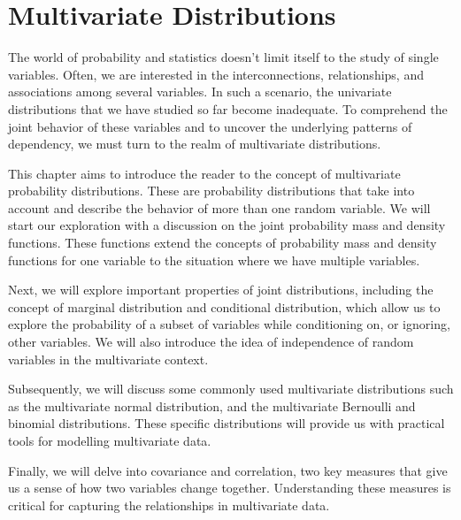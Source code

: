\chapter{Multivariate Distributions}

The world of probability and statistics doesn't limit itself to the
study of single variables. Often, we are interested in the
interconnections, relationships, and associations among several
variables. In such a scenario, the univariate distributions that we
have studied so far become inadequate. To comprehend the joint
behavior of these variables and to uncover the underlying patterns of
dependency, we must turn to the realm of multivariate distributions.

This chapter aims to introduce the reader to the concept of
multivariate probability distributions. These are probability
distributions that take into account and describe the behavior of more
than one random variable. We will start our exploration with a
discussion on the joint probability mass and density functions. These
functions extend the concepts of probability mass and density
functions for one variable to the situation where we have multiple
variables.

Next, we will explore important properties of joint distributions,
including the concept of marginal distribution and conditional
distribution, which allow us to explore the probability of a subset of
variables while conditioning on, or ignoring, other variables. We will
also introduce the idea of independence of random variables in the
multivariate context.

Subsequently, we will discuss some commonly used multivariate
distributions such as the multivariate normal distribution, and the
multivariate Bernoulli and binomial distributions. These specific
distributions will provide us with practical tools for modelling
multivariate data.

Finally, we will delve into covariance and correlation, two key
measures that give us a sense of how two variables change
together. Understanding these measures is critical for capturing the
relationships in multivariate data.


